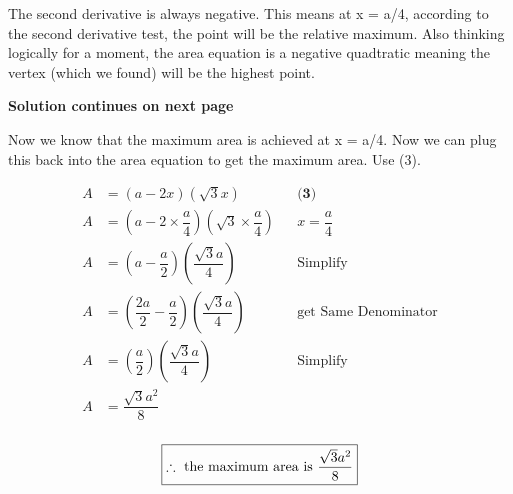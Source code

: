 \documentclass[12pt]{book}
\begin{document}
\begin{enumerate}
The second derivative is always negative. This means at x = a/4, 
according to the second derivative test, the point will be the 
relative maximum. Also thinking logically for a moment, the area 
equation is a negative quadtratic meaning the vertex (which we 
found) will be the highest point.

\vspace{0.5cm}
\textbf{Solution continues on next page}

\newpage

\vspace{0.5cm}
Now we know that the maximum area is achieved at x = a/4. Now we 
can plug this back into the area equation to get the maximum area. Use (3).

\addtolength{\jot}{0.5em}
\begin{align*}
    A &= (a - 2x)(\sqrt3x) && \textbf{(3)} \\
    A &= \left(a - 2\times\dfrac{a}{4}\right)\left(\sqrt3\times\dfrac{a}{4}\right) && x=\dfrac{a}{4} \\
    A &= \left(a - \dfrac{a}{2}\right)\left(\dfrac{\sqrt3a}{4}\right) && \text{Simplify} \\
    A &= \left(\dfrac{2a}{2} - \dfrac{a}{2}\right)\left(\dfrac{\sqrt3a}{4}\right) && \text{get Same Denominator} \\
    A &= \left(\dfrac{a}{2}\right)\left(\dfrac{\sqrt3a}{4}\right) && \text{Simplify} \\
    A &= \dfrac{\sqrt3a^2}{8} \\
\end{align*}

$$\boxed{\therefore \text{\space the maximum area is } \dfrac{\sqrt3a^2}{8} }$$

\newpage



\end{enumerate}
\end{document}
